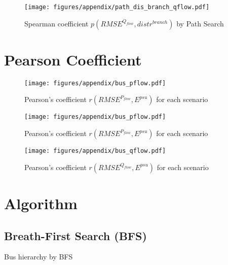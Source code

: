 \begin{appendices}
    \begin{figure}[!h]
        \centering
        \texttt{[image: figures/appendix/path\_dis\_branch\_qflow.pdf]}
        \caption{Spearman coefficient $p(RMSE^{Q_{flow}},distr^{branch})$ by Path Search}
        \label{fig:app_db_branch_qflow_path}
    \end{figure}
    
\section{Pearson Coefficient}

    \begin{figure}[!h]
        \centering
        \texttt{[image: figures/appendix/bus\_pflow.pdf]}
        \caption{Pearson's coefficient $r(RMSE^{P_{flow}},E^{psu})$ for each scenario}
        \label{fig:app_bus_pflow}
    \end{figure}
    
    \begin{figure}[!h]
        \centering
        \texttt{[image: figures/appendix/bus\_pflow.pdf]}
        \caption{Pearson's coefficient $r(RMSE^{P_{flow}},E^{psu})$ for each scenario}
        \label{fig:app_bus_pflow}
    \end{figure}

    \begin{figure}[!h]
        \centering
        \texttt{[image: figures/appendix/bus\_qflow.pdf]}
        \caption{Pearson's coefficient $r(RMSE^{Q_{flow}},E^{psu})$ for each scenario}
        \label{fig:app_bus_qflow}
    \end{figure}    

\end{appendices}

\newpage

\section{Algorithm}

\subsection{Breath-First Search (BFS)}

\begin{algorithm}[H]

\caption{Bus hierarchy by BFS}
\label{alg:Bus hier by BFS}
\end{algorithm}

